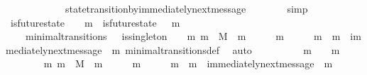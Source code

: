 \begin{isabellebody}
\ \ \ \ \ \ \ \ \ \ \ \ state{\isacharunderscore}transition{\isacharunderscore}by{\isacharunderscore}immediately{\isacharunderscore}next{\isacharunderscore}message\isanewline
\ \ \ \ \ \ \isamarkupfalse%
\ simp\isanewline
\ \ \ \ \isamarkupfalse%
\ {\isachardoublequoteopen}is{\isacharunderscore}future{\isacharunderscore}state\ {\isacharparenleft}{\isasymsigma}{\isacharcomma}\ {\isasymsigma}\ {\isasymunion}\ {\isacharbraceleft}m{}{\isacharbraceright}{\isacharparenright}\ {\isasymand}\ is{\isacharunderscore}future{\isacharunderscore}state\ {\isacharparenleft}{\isasymsigma}\ {\isasymunion}\ {\isacharbraceleft}m{}{\isacharbraceright}{\isacharcomma}\ {\isasymsigma}{\isacharprime}{\isacharparenright}{\isachardoublequoteclose}\isanewline
\ \ \ \ \ \ \isamarkupfalse%
\ {\isacartoucheopen}{\isacharparenleft}{\isasymsigma}{\isacharcomma}\ {\isasymsigma}{\isacharprime}{\isacharparenright}\ {\isasymin}\ minimal{\isacharunderscore}transitions\ {\isasymand}\ {\isasymnot}\ is{\isacharunderscore}singleton\ {\isacharparenleft}{\isasymsigma}{\isacharprime}\ {\isacharminus}\ {\isasymsigma}{\isacharparenright}{\isacartoucheclose}\ {\isacartoucheopen}{\isacharbraceleft}m{}{\isacharcomma}\ m{}{\isacharbraceright}\ {\isasymsubseteq}\ M\ {\isasymand}\ m{}\ {\isasymin}\ {\isasymsigma}{\isacharprime}\ {\isacharminus}\ {\isasymsigma}\ {\isasymand}\ m{}\ {\isasymin}\ {\isasymsigma}{\isacharprime}\ {\isacharminus}\ {\isasymsigma}\ {\isasymand}\ m{}\ {\isasymnoteq}\ m{}\ {\isasymand}\ immediately{\isacharunderscore}next{\isacharunderscore}message\ {\isacharparenleft}{\isasymsigma}{\isacharcomma}\ m{}{\isacharparenright}{\isacartoucheclose}\ minimal{\isacharunderscore}transitions{\isacharunderscore}def\ \isamarkupfalse%
\ auto\isanewline
\ \ \ \ \isamarkupfalse%
\ {\isachardoublequoteopen}{\isasymsigma}\ {\isasymnoteq}\ {\isasymsigma}\ {\isasymunion}\ {\isacharbraceleft}m{}{\isacharbraceright}\ {\isasymand}\ {\isasymsigma}\ {\isasymunion}\ {\isacharbraceleft}m{}{\isacharbraceright}\ {\isasymnoteq}\ {\isasymsigma}{\isacharprime}{\isachardoublequoteclose}\isanewline
\ \ \ \ \ \ \isamarkupfalse%
\ {\isacartoucheopen}{\isacharbraceleft}m{}{\isacharcomma}\ m{}{\isacharbraceright}\ {\isasymsubseteq}\ M\ {\isasymand}\ m{}\ {\isasymin}\ {\isasymsigma}{\isacharprime}\ {\isacharminus}\ {\isasymsigma}\ {\isasymand}\ m{}\ {\isasymin}\ {\isasymsigma}{\isacharprime}\ {\isacharminus}\ {\isasymsigma}\ {\isasymand}\ m{}\ {\isasymnoteq}\ m{}\ {\isasymand}\ immediately{\isacharunderscore}next{\isacharunderscore}message\ {\isacharparenleft}{\isasymsigma}{\isacharcomma}\ m{}{\isacharparenright}{\isacartoucheclose}\ \isamarkupfalse%

\end{isabellebody}
